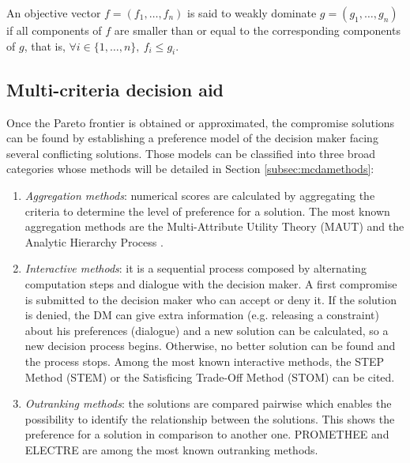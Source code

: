 \begin{definition}
An objective vector $f=(f_1, \dots, f_n)$ is said to weakly dominate $g=(g_1, \dots, g_n)$ if all components of $f$ are smaller than or equal to the corresponding components of $g$, that is, $\forall i \in \{1, \dots, n\},~ f_i \leq g_i$.
\end{definition}

\subsection{Multi-criteria decision aid}
\label{subsec:mcda}
Once the Pareto frontier is obtained or approximated, the compromise solutions can be found by establishing a preference model of the decision maker facing several conflicting solutions. Those models can be classified into three broad categories \cite{Vin92, beltstew} whose methods will be detailed in Section \ref{subsec:mcdamethods}:

\begin{enumerate}
\item \textit{Aggregation methods}: numerical scores are calculated by aggregating the criteria to determine the level of preference for a solution. The most known aggregation methods are the Multi-Attribute Utility Theory (MAUT) \cite{MMAUT} and the Analytic Hierarchy Process \cite{MAHP}.
\item \textit{Interactive methods}: it is a sequential process composed by alternating computation steps and dialogue with the decision maker. A first compromise is submitted to the decision maker who can accept or deny it. If the solution is denied, the DM can give extra information (e.g. releasing a constraint) about his preferences (dialogue) and a new solution can be calculated, so a new decision process begins. Otherwise, no better solution can be found and the process stops. Among the most known interactive methods, the STEP Method (STEM) \cite{benayoun71} or the Satisficing Trade-Off Method (STOM) \cite{nakayama84} can be cited.
\item \textit{Outranking methods}: the solutions are compared pairwise which enables the possibility to identify the relationship between the solutions. This shows the preference for a solution in comparison to another one. PROMETHEE \cite{Brans1} and ELECTRE \cite{Roy66} are among the most known outranking methods.
\end{enumerate}


